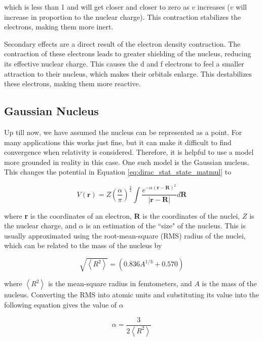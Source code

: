 which is less than 1 and will get closer and closer to zero as $v$ increases ($v$ will increase in proportion to the nuclear charge). This contraction stabilizes the electrons, making them more inert. 

Secondary effects are a direct result of the electron density contraction. The contraction of these electrons leads to greater shielding of the nucleus, reducing its effective nuclear charge. This causes the d and f electrons to feel a smaller attraction to their nucleus, which makes their orbitals enlarge. This destabilizes these electrons, making them more reactive\cite{Piela}.

\subsection{Gaussian Nucleus}
Up till now, we have assumed the nucleus can be represented as a point. For many applications this works just fine, but it can make it difficult to find convergence when relativity is considered. Therefore, it is helpful to use a model more grounded in reality in this case. One such model is the Gaussian nucleus. This changes the potential in Equation \ref{eq:dirac_stat_state_matmul} to

\begin{equation}
\label{eq:gauss_nuc_pot}
V(\textbf{r}) = Z\left(\frac{\alpha}{\pi}\right)^{\frac{3}{2}}\int\frac{e^{-\alpha(\textbf{r} - \textbf{R})^{2}}}{|\textbf{r} - \textbf{R}|}d\textbf{R}
\end{equation}

where \textbf{r} is the coordinates of an electron, \textbf{R} is the coordinates of the nuclei, $Z$ is the nuclear charge, and $\alpha$ is an estimation of the ``size" of the nucleus. This is usually approximated using the root-mean-square (RMS) radius of the nuclei\cite{VISSCHER1997207}, which can be related to the mass of the nucleus by\cite{1985ADNDT..33..405J}

\begin{equation}
\label{eq:gauss_nuc_RMS}
\sqrt{\left<R^{2}\right>} = \left(0.836A^{1/3} + 0.570\right)
\end{equation}

where $\left<R^{2}\right>$ is the mean-square radius in femtometers, and $A$ is the mass of the nucleus. Converting the RMS into atomic units and substituting its value into the following equation gives the value of $\alpha$\cite{VISSCHER1997207}

\begin{equation}
\label{eq:gauss_nuc_alpha}
\alpha = \frac{3}{2\left<R^{2}\right>}
\end{equation}

